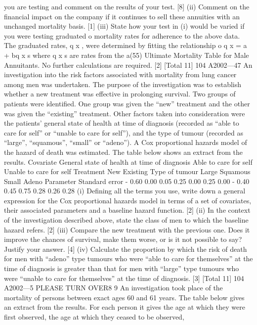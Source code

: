 you are testing and comment on the results of your test.
[8]
(ii) Comment on the financial impact on the company if it continues to sell these
annuities with an unchanged mortality basis.
[1]
(iii) State how your test in (i) would be varied if you were testing graduated
o
mortality rates for adherence to the above data. The graduated rates, q x , were
determined by fitting the relationship
o
q x = a + bq x s
where q x s are rates from the a(55) Ultimate Mortality Table for Male
Annuitants. No further calculations are required.
[2]
[Total 11]
104 A2002—47
An investigation into the risk factors associated with mortality from lung cancer
among men was undertaken. The purpose of the investigation was to establish
whether a new treatment was effective in prolonging survival. Two groups of patients
were identified. One group was given the “new” treatment and the other was given
the “existing” treatment. Other factors taken into consideration were the patients’
general state of health at time of diagnosis (recorded as “able to care for self” or
“unable to care for self”), and the type of tumour (recorded as “large”, “squamous”,
“small” or “adeno”).
A Cox proportional hazards model of the hazard of death was estimated. The table
below shows an extract from the results.
Covariate
General state of health at time of diagnosis
Able to care for self
Unable to care for self
Treatment
New
Existing
Type of tumour
Large
Squamous
Small
Adeno
Parameter Standard error
- 0.60
0.00 0.05
0.25
0.00 0.25
0.00
- 0.40
0.45
0.75
0.28
0.26
0.28
(i) Defining all the terms you use, write down a general expression for the Cox
proportional hazards model in terms of a set of covariates, their associated
parameters and a baseline hazard function.
[2]
(ii) In the context of the investigation described above, state the class of men to
which the baseline hazard refers.
[2]
(iii) Compare the new treatment with the previous one. Does it improve the
chances of survival, make them worse, or is it not possible to say? Justify
your answer.
[4]
(iv) Calculate the proportion by which the risk of death for men with “adeno” type
tumours who were “able to care for themselves” at the time of diagnosis is
greater than that for men with “large” type tumours who were “unable to care
for themselves” at the time of diagnosis.
[3]
[Total 11]
104 A2002—5
PLEASE TURN OVER8
9
An investigation took place of the mortality of persons between exact ages 60 and 61
years. The table below gives an extract from the results. For each person it gives the
age at which they were first observed, the age at which they ceased to be observed,
